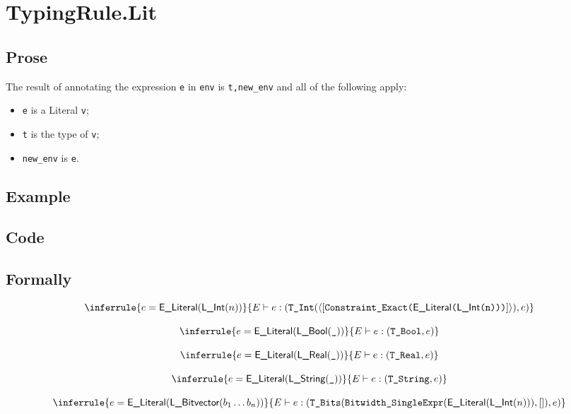\documentclass{book}
\newcommand\Ignore[0]{\texttt{\_}}
\newcommand\eliteral[1]{\textsf{E\_Literal}(#1)}
\begin{document}
\section{TypingRule.Lit \label{sec:TypingRule.Lit}}

  \subsection{Prose}
  The result of annotating the expression \texttt{e} in \texttt{env} is
\texttt{t,new\_env} and all of the following apply:
  \begin{itemize}
  \item \texttt{e} is a Literal \texttt{v};
  \item \texttt{t} is the type of \texttt{v};
  \item \texttt{new\_env} is \texttt{e}.
  \end{itemize}

  \subsection{Example}

  \subsection{Code}
 
\begin{emptyformal}
  \subsection{Formally}
  
\[
\begin{array}{c}
\inferrule{e = \eliteral{\lint(n)}}{E \entails e : (\TInt(\langle[\texttt{Constraint\_Exact(\eliteral{\lint(n)})}]\rangle), e)}\\
\\
\inferrule{e = \eliteral{\lbool(\Ignore)}}{E \entails e : (\TBool, e)}\\
\\
\inferrule{e = \eliteral{\lreal(\Ignore)}}{E \entails e : (\TReal, e)}\\
\\
\inferrule{e = \eliteral{\lstring(\Ignore)}}{E \entails e : (\TString, e)}\\
\\
\inferrule{e = \eliteral{\lbitvector(b_1 \ldots b_n)}}
{E \entails e : (\TBits(\texttt{Bitwidth\_SingleExpr}(\eliteral{\lint(n)}), []), e)}\\
\end{array}
\]
\end{emptyformal}
\end{document}
